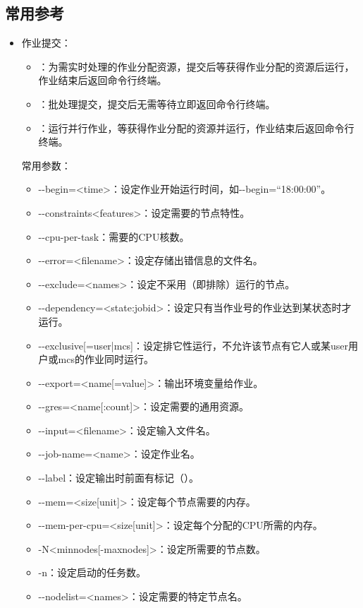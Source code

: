 \subsection{常用参考}
\begin{itemize}
\item 作业提交：
\begin{itemize}
	\item {}：为需实时处理的作业分配资源，提交后等获得作业分配的资源后运行，作业结束后返回命令行终端。
	\item {}：批处理提交，提交后无需等待立即返回命令行终端。
	\item {}：运行并行作业，等获得作业分配的资源并运行，作业结束后返回命令行终端。
\end{itemize}
常用参数：
\begin{itemize}
	\item -{}-begin=<time>：设定作业开始运行时间，如-{}-begin=``18:00:00''。
	\item -{}-constraints<features>：设定需要的节点特性。
	\item -{}-cpu-per-task：需要的CPU核数。
	\item -{}-error=<filename>：设定存储出错信息的文件名。
	\item -{}-exclude=<names>：设定不采用（即排除）运行的节点。
	\item -{}-dependency=<state:jobid>：设定只有当作业号的作业达到某状态时才运行。
	\item -{}-exclusive[=user|mcs]：设定排它性运行，不允许该节点有它人或某user用户或mcs的作业同时运行。
	\item -{}-export=<name[=value]>：输出环境变量给作业。
	\item -{}-gres=<name[:count]>：设定需要的通用资源。
	\item -{}-input=<filename>：设定输入文件名。
	\item -{}-job-name=<name>：设定作业名。
	\item -{}-label：设定输出时前面有标记（）。
	\item -{}-mem=<size[unit]>：设定每个节点需要的内存。
	\item -{}-mem-per-cpu=<size[unit]>：设定每个分配的CPU所需的内存。
	\item -N<minnodes[-maxnodes]>：设定所需要的节点数。
	\item -n：设定启动的任务数。
	\item -{}-nodelist=<names>：设定需要的特定节点名。

\end{itemize}
\end{itemize}
